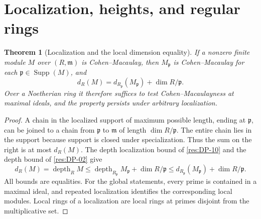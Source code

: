 \documentclass[11pt,oneside,openany]{book}
\newtheorem{theorem}{Theorem}[chapter]
\theoremstyle{definition}
\theoremstyle{remark}
\begin{document}
\section{Localization, heights, and regular rings}

\begin{theorem}[Localization and the local dimension equality]
\label{res:CM-06}
If a nonzero finite module $M$ over $(R,\mathfrak m)$ is
Cohen--Macaulay, then $M_{\mathfrak p}$ is Cohen--Macaulay for
each $\mathfrak p\in\operatorname{Supp}(M)$, and
\[
 d_R(M)=d_{R_{\mathfrak p}}(M_{\mathfrak p})+\dim R/\mathfrak p.
\]
Over a Noetherian ring it therefore suffices to test
Cohen--Macaulayness at maximal ideals, and the property persists
under arbitrary localization.
\end{theorem}
\begin{proof}
A chain in the localized support of maximum possible length,
ending at $\mathfrak p$, can be joined to a chain from
$\mathfrak p$ to $\mathfrak m$ of length $\dim R/\mathfrak p$.
The entire chain lies in the support because support is closed
under specialization. Thus the sum on the right is at most
$d_R(M)$. The depth localization bound of \ref{res:DP-10}
and the depth bound of \ref{res:DP-02} give
\[
 d_R(M)=\operatorname{depth}_R M
 \le \operatorname{depth}_{R_{\mathfrak p}} M_{\mathfrak p}
       +\dim R/\mathfrak p
 \le d_{R_{\mathfrak p}}(M_{\mathfrak p})+\dim R/\mathfrak p .
\]
All bounds are equalities. For the global statements, every
prime is contained in a maximal ideal, and repeated localization
identifies the corresponding local modules. Local rings of a
localization are local rings at primes disjoint from the
multiplicative set.
\end{proof}
\end{document}
